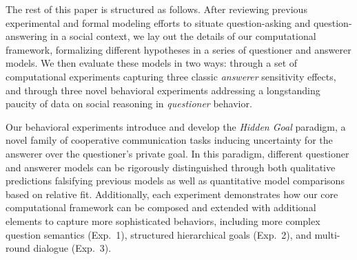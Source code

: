 \documentclass[11pt, floatsintext]{apa6}
\begin{document}
The rest of this paper is structured as follows. 
After reviewing previous experimental and formal modeling efforts to situate question-asking and question-answering in a social context, we lay out the details of our computational framework, formalizing different hypotheses in a series of questioner and answerer models. 
We then evaluate these models in two ways: through a set of computational experiments capturing three classic \emph{answerer} sensitivity effects, and through three novel behavioral experiments addressing a longstanding paucity of data on social reasoning in \emph{questioner} behavior. 

Our behavioral experiments introduce and develop the \emph{Hidden Goal} paradigm, a novel family of cooperative communication tasks inducing uncertainty for the answerer over the questioner's private goal. 
In this paradigm, different questioner and answerer models can be rigorously distinguished through both qualitative predictions falsifying previous models as well as quantitative model comparisons based on relative fit. 
Additionally, each experiment demonstrates how our core computational framework can be composed and extended with additional elements to capture more sophisticated behaviors, including more complex question semantics (Exp.~1), structured hierarchical goals (Exp.~2), and multi-round dialogue (Exp.~3). 

\end{document}
